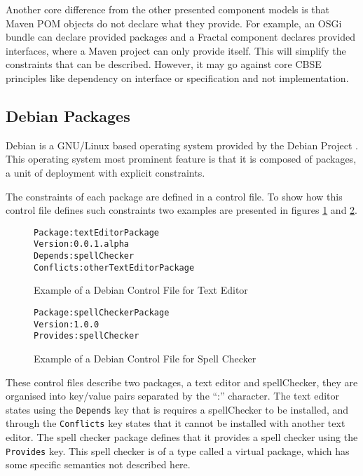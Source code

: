 Another core difference from the other presented component models is that Maven POM objects do not declare what they provide.
For example, an OSGi bundle can declare provided packages and a Fractal component declares provided interfaces, where a Maven project can only provide itself.
This will simplify the constraints that can be described. 
However, it may go against core CBSE principles like dependency on interface or specification \citep{Szyperski2002} and not implementation.

\subsection{Debian Packages}
Debian is a GNU/Linux based operating system provided by the Debian Project \citep{Barth2005}.
This operating system most prominent feature is that it is composed of packages, a unit of deployment with explicit constraints.

The constraints of each package are defined in a control file.
To show how this control file defines such constraints two examples are presented in figures \ref{debianmetadatate} and \ref{debianmetadatasc}.

\begin{figure}[htp]
\begin{center}
\begin{alltt}
Package: textEditorPackage
Version: 0.0.1.alpha
Depends: spellChecker
Conflicts: otherTextEditorPackage
\end{alltt}
  \caption[Debian Control file for Text Editor]{Example of a Debian Control File for Text Editor}
  \label{debianmetadatate}
\end{center}
\end{figure}

\begin{figure}[htp]
\begin{center}
\begin{alltt}
Package: spellCheckerPackage
Version: 1.0.0
Provides: spellChecker
\end{alltt}
  \caption[Debian Control files for Spell Checker]{Example of a Debian Control File for Spell Checker}
  \label{debianmetadatasc}
\end{center}
\end{figure}

These control files describe two packages, a text editor and spellChecker, they are organised into key/value pairs separated by the ``:'' character.
The text editor states using the \texttt{Depends} key that is requires a spellChecker to be installed, 
and through the \texttt{Conflicts} key states that it cannot be installed with another text editor.
The spell checker package defines that it provides a spell checker using the \texttt{Provides} key.
This spell checker is of a type called a virtual package, which has some specific semantics not described here.

